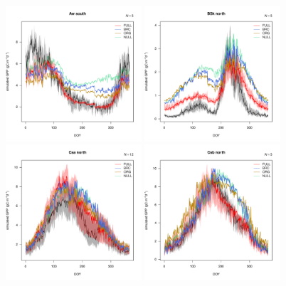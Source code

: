 \documentclass{myreport}
\begin{document}
 \begin{figure}[!ht]
\includegraphics[width=0.45\textwidth]{fig/meandoy_byzone_Aw_south_.pdf}
\includegraphics[width=0.45\textwidth]{fig/meandoy_byzone_BSk_north_.pdf}\\
\includegraphics[width=0.45\textwidth]{fig/meandoy_byzone_Csa_north_.pdf}
\includegraphics[width=0.45\textwidth]{fig/meandoy_byzone_Csb_north_.pdf}\\

\end{figure}
\end{document}
